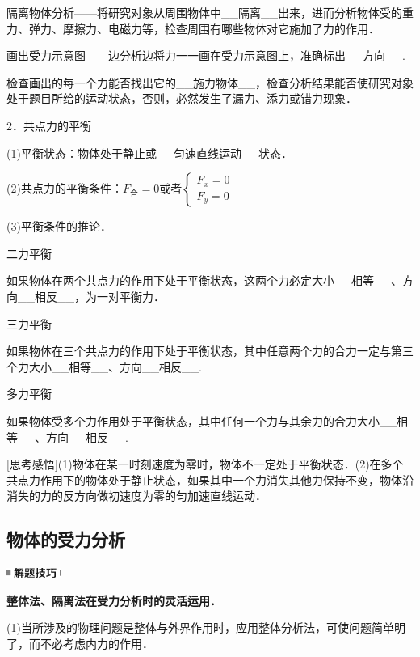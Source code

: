 隔离物体分析------将研究对象从周围物体中\_\_隔离\_\_出来，进而分析物体受的重力、弹力、摩擦力、电磁力等，检查周围有哪些物体对它施加了力的作用．

画出受力示意图------边分析边将力一一画在受力示意图上，准确标出\_\_方向\_\_.

检查画出的每一个力能否找出它的\_\_施力物体\_\_，检查分析结果能否使研究对象处于题目所给的运动状态，否则，必然发生了漏力、添力或错力现象．

2．共点力的平衡

(1)平衡状态：物体处于静止或\_\_匀速直线运动\_\_状态．

(2)共点力的平衡条件：$F_{\text{合}}=0$或者$\left\{\begin{array}{l}F_{x}=0 \\ F_{y}=0\end{array}\right.$

(3)平衡条件的推论．

二力平衡

如果物体在两个共点力的作用下处于平衡状态，这两个力必定大小\_\_相等\_\_、方向\_\_相反\_\_，为一对平衡力．

三力平衡

如果物体在三个共点力的作用下处于平衡状态，其中任意两个力的合力一定与第三个力大小\_\_相等\_\_、方向\_\_相反\_\_.

多力平衡

如果物体受多个力作用处于平衡状态，其中任何一个力与其余力的合力大小\_\_相等\_\_、方向\_\_相反\_\_.

{[}思考感悟{]}(1)物体在某一时刻速度为零时，物体不一定处于平衡状态．(2)在多个共点力作用下的物体处于静止状态，如果其中一个力消失其他力保持不变，物体沿消失的力的反方向做初速度为零的匀加速直线运动．
\newpage
\subsection{物体的受力分析}

\begin{center}\includegraphics[width=0.70833in,height=0.125in]{media/image37.png}

\textbf{整体法、隔离法在受力分析时的灵活运用．}
\end{center}


(1)当所涉及的物理问题是整体与外界作用时，应用整体分析法，可使问题简单明了，而不必考虑内力的作用．

